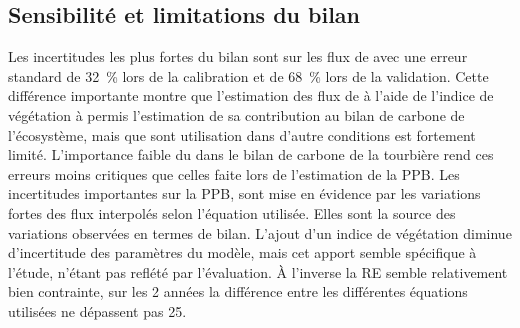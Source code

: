 


%
%
%
%
%





\subsection{Sensibilité et limitations du bilan}

Les incertitudes les plus fortes du bilan sont sur les flux de \chh avec une erreur standard de \SI{32}{\percent} lors de la calibration et de \SI{68}{\percent} lors de la validation.
Cette différence importante montre que l'estimation des flux de \chh à l'aide de l'indice de végétation à permis l'estimation de sa contribution au bilan de carbone de l'écosystème, mais que sont utilisation dans d'autre conditions est fortement limité.
L'importance faible du \chh dans le bilan de carbone de la tourbière rend ces erreurs moins critiques que celles faite lors de l'estimation de la PPB.
Les incertitudes importantes sur la PPB, sont mise en évidence par les variations fortes des flux interpolés selon l'équation utilisée.
Elles sont la source des variations observées en termes de bilan.
L'ajout d'un indice de végétation diminue d'incertitude des paramètres du modèle, mais cet apport semble spécifique à l'étude, n'étant pas reflété par l'évaluation.
À l'inverse la RE semble relativement bien contrainte, sur les 2 années la différence entre les différentes équations utilisées ne dépassent pas \SI{25}{\gcma}.

